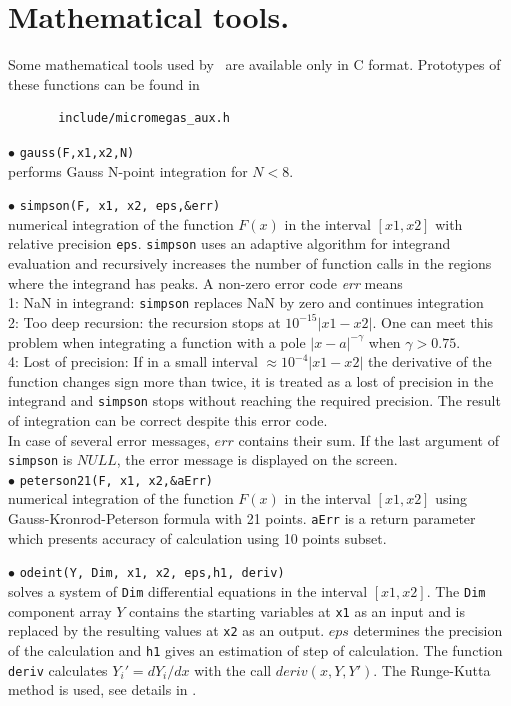 \documentclass[12pt,a4paper]{article}
\begin{document}
\section{Mathematical tools.}

Some mathematical tools used by \micro\ are available only 
in C format. Prototypes of these functions can be found in
\begin{verbatim}
       include/micromegas_aux.h 
\end{verbatim}

\noindent$\bullet$ \verb|gauss(F,x1,x2,N)|\\
performs Gauss N-point integration for $N<8$.  


\noindent$\bullet$ \verb|simpson(F, x1, x2, eps,&err)|\\
numerical integration of the function $F(x)$ in the interval $[x1,x2]$  
with relative precision \verb|eps|. \verb|simpson| uses an adaptive algorithm 
for integrand evaluation and  recursively increases the number of function calls in 
the regions where the  integrand has peaks. A non-zero error code {\it err} means\\
1: NaN in integrand:  \verb|simpson| replaces NaN by zero and continues integration\\
2: Too deep recursion: the recursion stops at  $10^{-15}|x1-x2|$. One can meet this problem when integrating 
a function with a pole $|x-a|^{-\gamma}$ when $\gamma > 0.75$.  \\
4: Lost of precision:   If in a small interval $\approx 10^{-4}|x1-x2|$ the derivative of the 
function  changes  sign more than twice, it is treated as a lost of precision in the integrand and  \verb|simpson| stops without reaching 
the  required  precision. The result of integration can be  correct despite this error code.\\
In case of several error messages, $err$ contains their sum.  If the last argument of \verb|simpson| is $NULL$, the error message is displayed on  the screen.  \\

\noindent$\bullet$ \verb|peterson21(F, x1, x2,&aErr)|\\
numerical integration of the function $F(x)$ in the interval $[x1,x2]$ using Gauss-Kronrod-Peterson formula with 21 points. {\tt aErr} is a return parameter which presents accuracy of calculation using 10 points subset.  


\noindent$\bullet$ \verb|odeint(Y, Dim, x1, x2, eps,h1, deriv)|\\
solves a  system of \verb|Dim| differential  equations in the interval 
$[x1,x2]$. The  \verb|Dim| component array $Y$ contains the starting variables at \verb|x1| as an input and is replaced by the
resulting values at \verb|x2| as an output. $eps$ determines the precision of the 
calculation and  \verb|h1| gives an estimation of step of calculation.  
The function \verb|deriv| calculates 
$Y_i' = dY_i/dx$ with the call $deriv(x,Y,Y')$. The Runge-Kutta method is
used, see details in \cite{Numerical}. 
\end{document}
